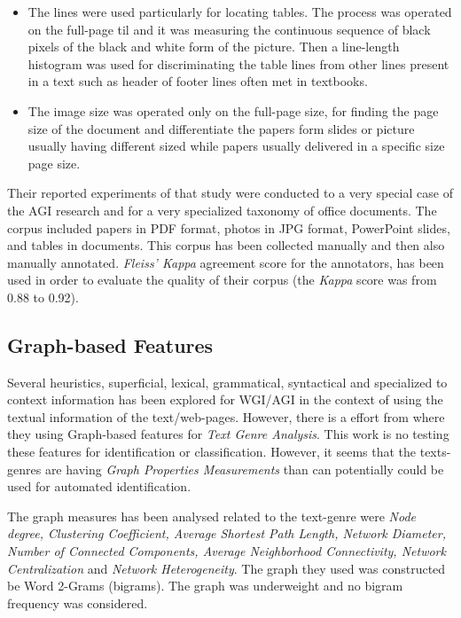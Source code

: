 \begin{itemize}
\item The lines were used particularly for locating tables. The process was operated on the full-page til and it was measuring the continuous sequence of black pixels of the black and white form of the picture. Then a line-length histogram was used for discriminating the table lines from other lines present in a text such as header of footer lines often met in textbooks.
\item The image size was operated only on the full-page size, for finding the page size of the document and differentiate the papers form slides or picture usually having different sized while papers usually delivered in a specific size page size.
\end{itemize}

Their reported experiments of that study were conducted to a very special case of  the AGI research and for a very specialized taxonomy of office documents. The corpus included papers in PDF format, photos in JPG format, PowerPoint slides, and tables in documents. This corpus has been collected manually and then also manually annotated. \textit{Fleiss' Kappa} agreement score for the annotators, has been used in order to evaluate the quality of their corpus (the \textit{Kappa} score was from 0.88 to 0.92).


\subsection{Graph-based Features} 

Several heuristics, superficial, lexical, grammatical, syntactical and specialized to context information has been explored for WGI/AGI in the context of using the textual information of the text/web-pages. However, there is a effort from \parencite{nabhan2016graph} where they using Graph-based features for \textit{Text Genre Analysis}. This work is no testing these features for identification or classification. However, it seems that the texts-genres are having \textit{Graph Properties Measurements} than can potentially could be used for automated identification.

The graph measures has been analysed related to the text-genre were \textit{Node degree, Clustering Coefficient, Average Shortest Path Length, Network Diameter, Number of Connected Components, Average Neighborhood Connectivity, Network Centralization} and \textit{Network Heterogeneity}. The graph they used was constructed be Word 2-Grams (bigrams). The graph was underweight and no bigram frequency was considered.  

